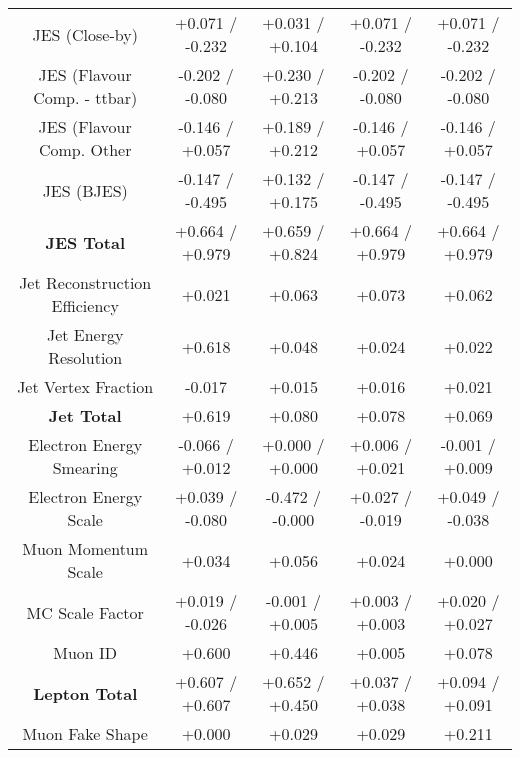\begin{table}[htbp]
\begin{center}
\begin{tabular}{|c|c|c|c|c|}
JES (Close-by)                        &+0.071   / -0.232   & +0.031   / +0.104   & +0.071   / -0.232   & +0.071   / -0.232  \\
JES (Flavour Comp. - ttbar)           &-0.202   / -0.080   & +0.230   / +0.213   & -0.202   / -0.080   & -0.202   / -0.080  \\
JES (Flavour Comp. Other              &-0.146   / +0.057   & +0.189   / +0.212   & -0.146   / +0.057   & -0.146   / +0.057  \\
JES (BJES)                            &-0.147   / -0.495   & +0.132   / +0.175   & -0.147   / -0.495   & -0.147   / -0.495  \\
\hline
\textbf{JES Total}                    &+0.664   / +0.979   & +0.659   / +0.824   & +0.664   / +0.979   & +0.664   / +0.979  \\
\hline
Jet Reconstruction Efficiency         &+0.021              & +0.063              & +0.073              & +0.062             \\
Jet Energy Resolution                 &+0.618              & +0.048              & +0.024              & +0.022             \\
Jet Vertex Fraction                   &-0.017              & +0.015              & +0.016              & +0.021             \\
\hline
\textbf{Jet Total}                    &+0.619              & +0.080              & +0.078              & +0.069             \\
\hline
Electron Energy Smearing              &-0.066   / +0.012   & +0.000   / +0.000   & +0.006   / +0.021   & -0.001   / +0.009  \\
Electron Energy Scale                 &+0.039   / -0.080   & -0.472   / -0.000   & +0.027   / -0.019   & +0.049   / -0.038  \\
Muon Momentum Scale                   &+0.034              & +0.056              & +0.024              & +0.000             \\
MC Scale Factor                       &+0.019   / -0.026   & -0.001   / +0.005   & +0.003   / +0.003   & +0.020   / +0.027  \\
Muon ID                               &+0.600              & +0.446              & +0.005              & +0.078             \\
\hline
\textbf{Lepton Total}                 &+0.607   / +0.607   & +0.652   / +0.450   & +0.037   / +0.038   & +0.094   / +0.091  \\
\hline
Muon Fake Shape                       &+0.000              & +0.029              & +0.029              & +0.211             \\

\end{tabular}
\end{center}
\end{table}
